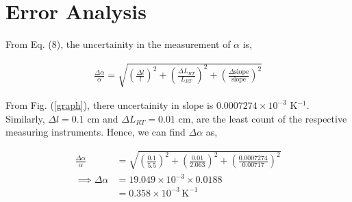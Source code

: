\section{Error Analysis}

From Eq. (8), the uncertainity in the measurement of $\alpha$ is,

\begin{align}
    \frac{\Delta \alpha}{\alpha} = \sqrt{\left(\frac{\Delta l}{l}\right)^2 + \left(\frac{\Delta L_{RT}}{L_{RT}}\right)^2 + \left(\frac{\Delta \text{slope}}{\text{slope}}\right)^2}
\end{align}

From Fig. (\ref{graph}), there uncertainity in slope is $0.0007274 \times 10^{-3}$ K$^{-1}$. Similarly, $\Delta l = 0.1$ cm and $\Delta L_{RT} = 0.01$ cm, are the least count of the respective measuring instruments. Hence, we can find $\Delta \alpha$ as,

\begin{align*}
    \frac{\Delta \alpha}{\alpha} &= \sqrt{\left(\frac{0.1}{5.5}\right)^2 + \left(\frac{0.01}{2.063}\right)^2 + \left(\frac{0.0007274}{\text{0.00717}}\right)^2}\\
    \implies \Delta \alpha &= 19.049 \times 10^{-3} \times 0.0188\\
    &= 0.358 \times 10^{-3}\,\text{K}^{-1} 
\end{align*}